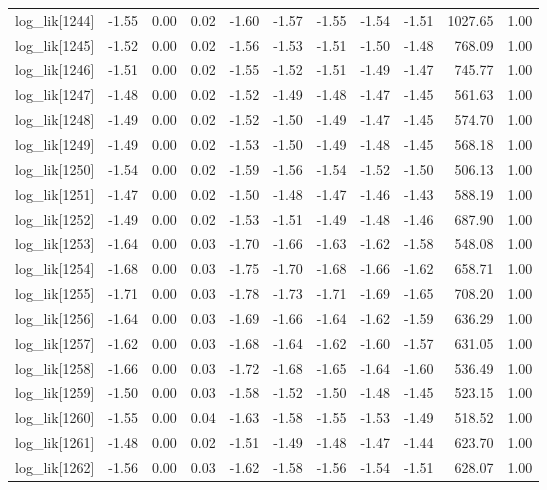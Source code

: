 \begin{table}[ht]
\begin{tabular}{rrrrrrrrrrr}
  log\_lik[1244] & -1.55 & 0.00 & 0.02 & -1.60 & -1.57 & -1.55 & -1.54 & -1.51 & 1027.65 & 1.00 \\ 
  log\_lik[1245] & -1.52 & 0.00 & 0.02 & -1.56 & -1.53 & -1.51 & -1.50 & -1.48 & 768.09 & 1.00 \\ 
  log\_lik[1246] & -1.51 & 0.00 & 0.02 & -1.55 & -1.52 & -1.51 & -1.49 & -1.47 & 745.77 & 1.00 \\ 
  log\_lik[1247] & -1.48 & 0.00 & 0.02 & -1.52 & -1.49 & -1.48 & -1.47 & -1.45 & 561.63 & 1.00 \\ 
  log\_lik[1248] & -1.49 & 0.00 & 0.02 & -1.52 & -1.50 & -1.49 & -1.47 & -1.45 & 574.70 & 1.00 \\ 
  log\_lik[1249] & -1.49 & 0.00 & 0.02 & -1.53 & -1.50 & -1.49 & -1.48 & -1.45 & 568.18 & 1.00 \\ 
  log\_lik[1250] & -1.54 & 0.00 & 0.02 & -1.59 & -1.56 & -1.54 & -1.52 & -1.50 & 506.13 & 1.00 \\ 
  log\_lik[1251] & -1.47 & 0.00 & 0.02 & -1.50 & -1.48 & -1.47 & -1.46 & -1.43 & 588.19 & 1.00 \\ 
  log\_lik[1252] & -1.49 & 0.00 & 0.02 & -1.53 & -1.51 & -1.49 & -1.48 & -1.46 & 687.90 & 1.00 \\ 
  log\_lik[1253] & -1.64 & 0.00 & 0.03 & -1.70 & -1.66 & -1.63 & -1.62 & -1.58 & 548.08 & 1.00 \\ 
  log\_lik[1254] & -1.68 & 0.00 & 0.03 & -1.75 & -1.70 & -1.68 & -1.66 & -1.62 & 658.71 & 1.00 \\ 
  log\_lik[1255] & -1.71 & 0.00 & 0.03 & -1.78 & -1.73 & -1.71 & -1.69 & -1.65 & 708.20 & 1.00 \\ 
  log\_lik[1256] & -1.64 & 0.00 & 0.03 & -1.69 & -1.66 & -1.64 & -1.62 & -1.59 & 636.29 & 1.00 \\ 
  log\_lik[1257] & -1.62 & 0.00 & 0.03 & -1.68 & -1.64 & -1.62 & -1.60 & -1.57 & 631.05 & 1.00 \\ 
  log\_lik[1258] & -1.66 & 0.00 & 0.03 & -1.72 & -1.68 & -1.65 & -1.64 & -1.60 & 536.49 & 1.00 \\ 
  log\_lik[1259] & -1.50 & 0.00 & 0.03 & -1.58 & -1.52 & -1.50 & -1.48 & -1.45 & 523.15 & 1.00 \\ 
  log\_lik[1260] & -1.55 & 0.00 & 0.04 & -1.63 & -1.58 & -1.55 & -1.53 & -1.49 & 518.52 & 1.00 \\ 
  log\_lik[1261] & -1.48 & 0.00 & 0.02 & -1.51 & -1.49 & -1.48 & -1.47 & -1.44 & 623.70 & 1.00 \\ 
  log\_lik[1262] & -1.56 & 0.00 & 0.03 & -1.62 & -1.58 & -1.56 & -1.54 & -1.51 & 628.07 & 1.00 \\ 

\end{tabular}
\end{table}
